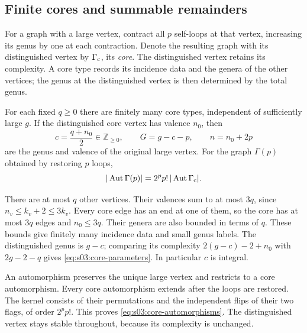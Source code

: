\subsection{Finite cores and summable remainders}
\label{subsec:s03:04}

For a graph with a large vertex, contract all $p$ self-loops at that
vertex, increasing its genus by one at each contraction. Denote the
resulting graph with its distinguished vertex by $\Gamma_{\rm c}$,
its \emph{core}.
The distinguished vertex retains its complexity. A core type records
its incidence data and the genera of the other vertices; the genus
at the distinguished vertex is then determined by the total genus.

\begin{lmm}
\label{lmm:s03:finite-cores}
For each fixed $q\geq0$ there are finitely many core types,
independent of sufficiently large $g$. If the distinguished core
vertex has valence $n_0$, then
\begin{equation}
\label{eq:s03:core-parameters}
c=\frac{q+n_0}{2}\in\mathbb Z_{\geq0},\qquad
G=g-c-p,\qquad n=n_0+2p
\end{equation}
are the genus and valence of the original large vertex.
For the graph $\Gamma(p)$ obtained by restoring $p$ loops,
\begin{equation}
\label{eq:s03:core-automorphisms}
|\operatorname{Aut}\Gamma(p)|
=2^pp!\,|\operatorname{Aut}\Gamma_{\rm c}|.
\end{equation}
\end{lmm}
\begin{prf}
There are at most $q$ other vertices. Their valences sum to at most
$3q$, since $n_v\leq k_v+2\leq3k_v$.
Every core edge has an end at one of them, so the core has at most
$3q$ edges and $n_0\leq3q$. Their genera are also bounded in terms
of $q$. These bounds give finitely many incidence data and small
genus labels. The distinguished genus is $g-c$; comparing its
complexity $2(g-c)-2+n_0$ with $2g-2-q$ gives
\eqref{eq:s03:core-parameters}. In particular $c$ is integral.

An automorphism preserves the unique large vertex and restricts to
a core automorphism. Every core automorphism extends after the loops
are restored. The kernel consists of their permutations and the
independent flips of their two flags, of order $2^pp!$.
This proves \eqref{eq:s03:core-automorphisms}. The distinguished
vertex stays stable throughout, because its complexity is unchanged.
\end{prf}

